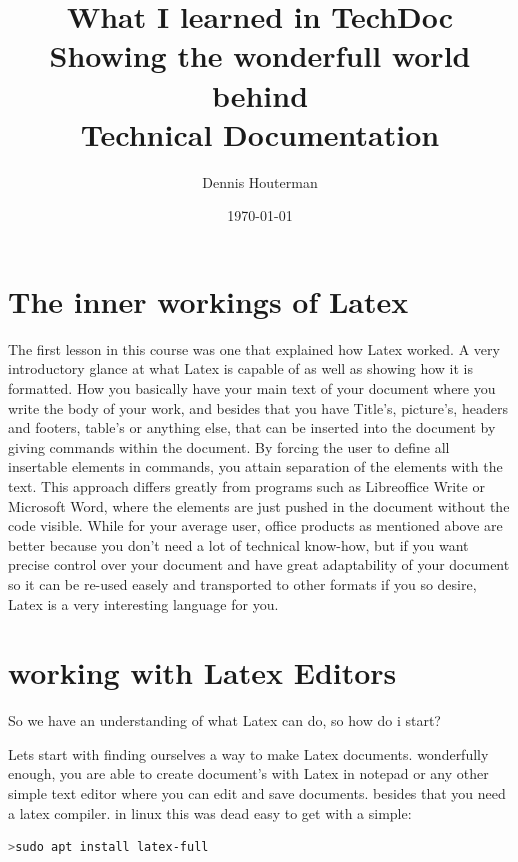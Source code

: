 \documentclass{article}
\begin{document}
\title{%
		What I learned in TechDoc \\
\large Showing the wonderfull world behind \\
		Technical Documentation}
\author{Dennis Houterman}
\date{\today}
\maketitle
\newpage
\tableofcontents
\newpage
\section{The inner workings of Latex}
The first lesson in this course was one that explained how Latex worked. A very introductory glance at what Latex is capable of as well as showing how it is formatted. How you basically have your main text of your document where you write the body of your work, and besides that you have Title's, picture's, headers and footers, table's or anything else, that can be inserted into the document by giving commands within the document. By forcing the user to define all insertable elements in commands, you attain separation of the elements with the text. This approach differs greatly from programs such as Libreoffice Write or Microsoft Word, where the elements are just pushed in the document without the code visible. While for your average user, office products as mentioned above are better because you don't need a lot of technical know-how, but if you want precise control over your document and have great adaptability of your document so it can be re-used easely and transported to other formats if you so desire, Latex is a very interesting language for you.
    
\newpage    
\section{working with Latex Editors}
So we have an understanding of what Latex can do, so how do i start? 

Lets start with finding ourselves a way to make Latex documents. wonderfully enough, you are able to create document's with Latex in notepad or any other simple text editor where you can edit and save documents. besides that you need a latex compiler. in linux this was dead easy to get with a simple:

\begin{lstlisting}[language=bash]
	>sudo apt install latex-full
\end{lstlisting}
\end{document}
